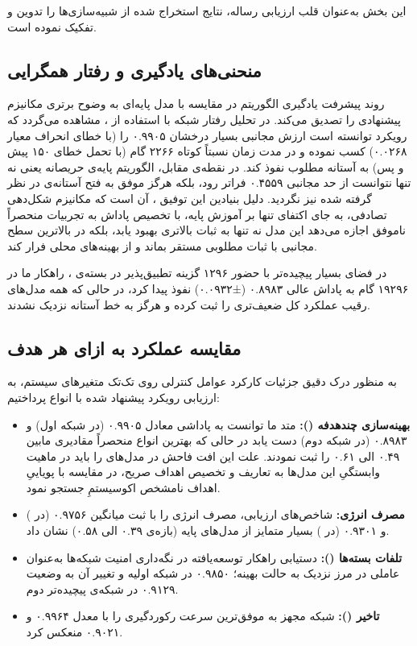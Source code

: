 \documentclass[oneside,openany,phd]{TMU-Thesis}
\begin{document}
این بخش به‌عنوان قلب ارزیابی رساله، نتایج استخراج شده از شبیه‌سازی‌ها را تدوین و تفکیک نموده است.

\subsection{منحنی‌های یادگیری و رفتار همگرایی}

روند پیشرفت یادگیری الگوریتم در مقایسه با مدل پایه‌ای به وضوح برتری مکانیزم پیشنهادی را تصدیق می‌کند.
در تحلیل رفتار شبکه با استفاده از ، مشاهده می‌گردد که رویکرد  توانسته است ارزش مجانبی بسیار درخشان ۰.۹۹۰۵ را (با خطای انحراف معیار ۰.۰۲۶۸) کسب نموده و در مدت زمان نسبتاً کوتاه ۲۲۶۶ گام (با تحمل خطای ۱۵۰ پیش و پس) به آستانه مطلوب نفوذ کند. در نقطه‌ی مقابل، الگوریتم پایه‌ی حریصانه یعنی  نه تنها نتوانست از حد مجانبی ۰.۴۵۵۹ فراتر رود، بلکه هرگز موفق به فتح آستانه‌ی در نظر گرفته شده نیز نگردید. دلیل بنیادین این توفیق ، آن است که مکانیزم شکل‌دهی تصادفی، به جای اکتفای تنها بر آموزش پایه، با تخصیص پاداش به تجربیات منحصراً ناموفق اجازه می‌دهد این مدل نه تنها به ثبات بالاتری بهبود یابد، بلکه در بالاترین سطح مجانبی با ثبات مطلوبی مستقر بماند و از بهینه‌های محلی فرار کند.

در فضای بسیار پیچیده‌تر با حضور ۱۲۹۶ گزینه تطبیق‌پذیر در بسته‌ی ، راهکار ما در ۱۹۲۹۶ گام به پاداش عالی ۰.۸۹۸۳ (±۰.۰۹۳۲) نفوذ پیدا کرد، در حالی که همه مدل‌های رقیب عملکرد کل ضعیف‌تری را ثبت کرده و هرگز به خط آستانه نزدیک نشدند.

\subsection{مقایسه عملکرد به ازای هر هدف}

به منظور درک دقیق جزئیات کارکرد عوامل کنترلی روی تک‌تک متغیرهای سیستم، به ارزیابی رویکرد پیشنهاد شده با انواع  پرداختیم:

\begin{itemize}
    \item \textbf{بهینه‌سازی چندهدفه ():} متد ما توانست به پاداشی معادل ۰.۹۹۰۵ (در شبکه اول) و ۰.۸۹۸۳ (در شبکه دوم) دست یابد در حالی که بهترین انواع  منحصراً مقادیری مابین ۰.۴۹ الی ۰.۶۱ را ثبت نمودند. علت این افت فاحش در مدل‌های  را باید در ماهیت وابستگیِ این مدل‌ها به تعاریف و تخصیص اهداف صریح، در مقایسه با پویاییِ اهداف نامشخص اکوسیستمِ  جستجو نمود.
    \item \textbf{مصرف انرژی:} شاخص‌های ارزیابی، مصرف انرژی  را با ثبت میانگین ۰.۹۷۵۶ (در ) و ۰.۹۳۰۱ (در ) بسیار متمایز از مدل‌های پایه (بازه‌‌ی ۰.۳۹ الی ۰.۵۸) نشان داد.
    \item \textbf{تلفات بسته‌ها ():} دستیابی راهکار توسعه‌یافته در نگه‌داری امنیت شبکه‌ها به‌عنوان عاملی در مرز نزدیک به حالت بهینه؛ ۰.۹۸۵۰ در شبکه اولیه و تغییر آن به وضعیت ۰.۹۱۲۹ در شبکه‌ی پیچیده‌تر دوم.
    \item \textbf{تاخیر ():} شبکه مجهز به  موفق‌ترین سرعت رکوردگیری را با معدل ۰.۹۹۶۴ و ۰.۹۰۲۱ منعکس کرد.
\end{itemize}
\end{document}
